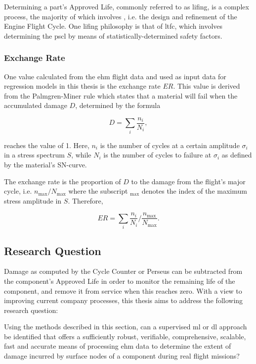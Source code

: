 Determining a part's Approved Life, commonly referred to as lifing, is a complex process, the majority of which involves  \cite{corran_lifing_2007}, i.e. the design and refinement of the Engine Flight Cycle. One lifing philosophy is that of \ac{ltfc}, which involves determining the \ac{pscl} by means of statistically-determined safety factors.

\subsubsection{Exchange Rate}
One value calculated from the \ac{ehm} flight data and used as input data for regression models in this thesis is the exchange rate \(ER\). This value is derived from the Palmgren-Miner rule \cite[]{palmgren_lebensdauer_1924} which states that a material will fail when the accumulated damage \(D\), determined by the formula

\[
    D = \sum_{i}{\frac{n_i}{N_i}},
\]

reaches the value of 1. Here, \(n_i\) is the number of cycles at a certain amplitude \(\sigma_i\) in a stress spectrum \(S\), while \(N_i\) is the number of cycles to failure at \(\sigma_i\) as defined by the material's SN-curve.

The exchange rate is the proportion of \(D\) to the damage from the flight's major cycle, i.e. \(n_{\text{max}} / N_{\text{max}}\) where the subscript \({}_\text{max}\) denotes the index of the maximum stress amplitude in \(S\). Therefore,

\[
    ER = \sum_{i}{\frac{n_i}{N_i}} \Big/ {\frac{n_{\text{max}}}{N_{\text{max}}}}.
\]

\subsection{Research Question}
Damage as computed by the Cycle Counter or Perseus can be subtracted from the component's Approved Life in order to monitor the remaining life of the component, and remove it from service when this reaches zero. With a view to improving current company processes, this thesis aims to address the following research question:

Using the methods described in this section, can a supervised \ac{ml} or \ac{dl} approach be identified that offers a sufficiently robust, verifiable, comprehensive, scalable, fast and accurate means of processing \ac{ehm} data to determine the extent of damage incurred by surface nodes of a component during real flight missions?

